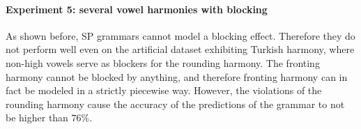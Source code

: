 \begin{table}[h!]
\centering
{}
\caption{SP learning of a single harmony with blockers; abstract representation.}
\end{table}


\paragraph{Experiment 5: several vowel harmonies with blocking}

As shown before, SP grammars cannot model a blocking effect.
Therefore they do not perform well even on the artificial dataset exhibiting Turkish harmony, where non-high vowels serve as blockers for the rounding harmony.
The fronting harmony cannot be blocked by anything, and therefore fronting harmony can in fact be modeled in a strictly piecewise way.
However, the violations of the rounding harmony cause the accuracy of the predictions of the grammar to not be higher than $76$\%.


